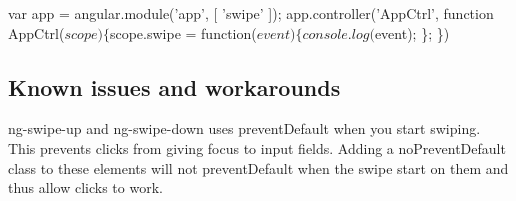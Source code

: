 \begin{quote}


\end{quote}

\begin{DoxyCode}
var app = angular.module('app', [ 'swipe' ]);
app.controller('AppCtrl', function AppCtrl($scope) \{
  $scope.swipe = function($event) \{
    console.log($event);
  \};
\})
\end{DoxyCode}


\subsection*{Known issues and workarounds}


\begin{DoxyItemize}
\item ng-\/swipe-\/up and ng-\/swipe-\/down uses prevent\+Default when you start swiping. This prevents clicks from giving focus to input fields. Adding a {\ttfamily no\+Prevent\+Default} class to these elements will not prevent\+Default when the swipe start on them and thus allow clicks to work. 
\end{DoxyItemize}
